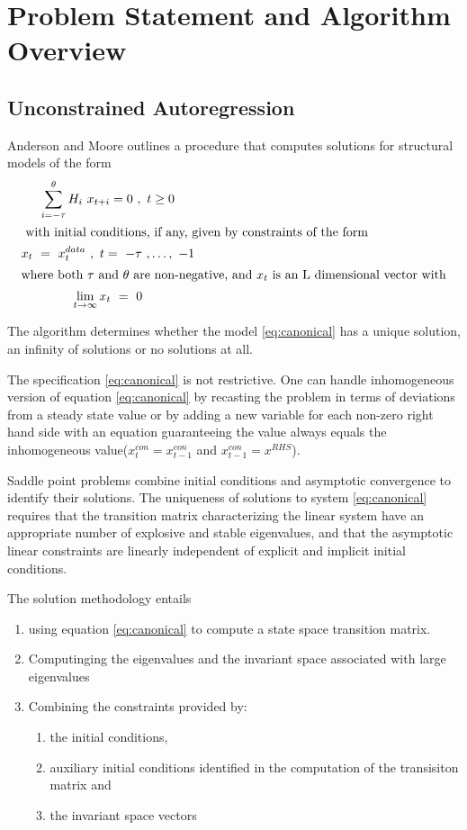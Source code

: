 \documentclass[12pt]{article}
\begin{document}
\section{Problem Statement and Algorithm Overview}

\subsection{Unconstrained Autoregression}
\label{sec:unconstrainedar}


Anderson and Moore \cite{ANDER:AIM2} outlines a procedure that computes solutions for structural models of the form
\begin{gather}
\sum_{i= - \tau}^\theta { H_i ~ x_{ t + i } }= 0~,~ t \geq 0 \label{eq:canonical}\\ \intertext{ with initial conditions, if any, given by constraints of the form}
x_t ~ = ~ x^{data}_t ~ , ~ t = ~ - \tau~, \ldots ,~ -1\\ \intertext{where both $\tau$ and $\theta$ are non-negative, and $x_t$ is an L dimensional vector with}
\lim_{ t \rightarrow \infty } x_t ~ = ~ 0
\end{gather}

The algorithm determines whether
the model \ref{eq:canonical} has a unique solution, an infinity of
 solutions or no solutions at all.

The specification \ref{eq:canonical} is not restrictive.
One can handle inhomogeneous version  of equation \ref{eq:canonical}
by recasting the problem in terms of  deviations from a steady state value or
by adding a new variable for each non-zero right hand side with an equation
guaranteeing the  value always equals  
the inhomogeneous value($x^{con}_t =x^{con}_{t-1}$ and $x^{con}_{t-1} = x^{RHS}$).



Saddle point problems combine initial conditions and asymptotic 
convergence to identify their solutions.
The uniqueness of solutions to 
system  \ref{eq:canonical} requires that
the transition matrix characterizing the linear system have an appropriate
number of explosive and stable eigenvalues\cite{blanchard80},
and that the asymptotic linear constraints 
are linearly independent of explicit and implicit initial 
conditions\cite{ANDER:AIM2}.

The solution methodology entails 
\begin{enumerate}
\item using equation \ref{eq:canonical} to
compute a state space transition matrix.
\item Computinging the eigenvalues and the invariant space associated with
large eigenvalues
\item Combining the constraints provided by:
  \begin{enumerate}
  \item the
initial conditions,
\item  auxiliary initial conditions identified in the computation of the transisiton matrix and 
\item the invariant space vectors
  \end{enumerate}
\end{enumerate}
\end{document}
